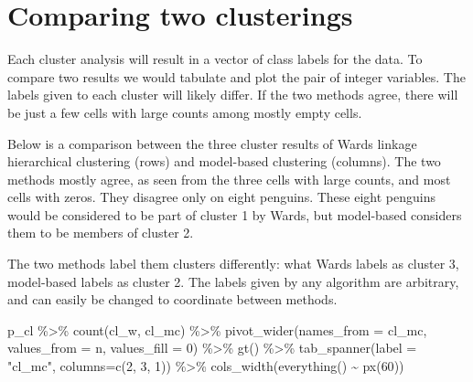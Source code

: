 \documentclass[
  letterpaper,
]{book}
\newenvironment{Shaded}{\begin{snugshade}}{\end{snugshade}}
\newcommand{\AttributeTok}[1]{\textcolor[rgb]{0.40,0.45,0.13}{#1}}
\newcommand{\DecValTok}[1]{\textcolor[rgb]{0.68,0.00,0.00}{#1}}
\newcommand{\FunctionTok}[1]{\textcolor[rgb]{0.28,0.35,0.67}{#1}}
\newcommand{\NormalTok}[1]{\textcolor[rgb]{0.00,0.23,0.31}{#1}}
\newcommand{\SpecialCharTok}[1]{\textcolor[rgb]{0.37,0.37,0.37}{#1}}
\newcommand{\StringTok}[1]{\textcolor[rgb]{0.13,0.47,0.30}{#1}}
\begin{document}
\hypertarget{comparing-two-clusterings}{%
\section{Comparing two clusterings}\label{comparing-two-clusterings}}

Each cluster analysis will result in a vector of class labels for the
data. To compare two results we would tabulate and plot the pair of
integer variables. The labels given to each cluster will likely differ.
If the two methods agree, there will be just a few cells with large
counts among mostly empty cells.

Below is a comparison between the three cluster results of Wards linkage
hierarchical clustering (rows) and model-based clustering (columns). The
two methods mostly agree, as seen from the three cells with large
counts, and most cells with zeros. They disagree only on eight penguins.
These eight penguins would be considered to be part of cluster 1 by
Wards, but model-based considers them to be members of cluster 2.

The two methods label them clusters differently: what Wards labels as
cluster 3, model-based labels as cluster 2. The labels given by any
algorithm are arbitrary, and can easily be changed to coordinate between
methods.

\begin{Shaded}
\begin{Highlighting}[]
\NormalTok{p\_cl }\SpecialCharTok{\%\textgreater{}\%} 
  \FunctionTok{count}\NormalTok{(cl\_w, cl\_mc) }\SpecialCharTok{\%\textgreater{}\%} 
  \FunctionTok{pivot\_wider}\NormalTok{(}\AttributeTok{names\_from =}\NormalTok{ cl\_mc, }
              \AttributeTok{values\_from =}\NormalTok{ n, }
              \AttributeTok{values\_fill =} \DecValTok{0}\NormalTok{) }\SpecialCharTok{\%\textgreater{}\%}
  \FunctionTok{gt}\NormalTok{() }\SpecialCharTok{\%\textgreater{}\%}
  \FunctionTok{tab\_spanner}\NormalTok{(}\AttributeTok{label =} \StringTok{"cl\_mc"}\NormalTok{, }\AttributeTok{columns=}\FunctionTok{c}\NormalTok{(}\StringTok{\textasciigrave{}}\AttributeTok{2}\StringTok{\textasciigrave{}}\NormalTok{, }\StringTok{\textasciigrave{}}\AttributeTok{3}\StringTok{\textasciigrave{}}\NormalTok{, }\StringTok{\textasciigrave{}}\AttributeTok{1}\StringTok{\textasciigrave{}}\NormalTok{)) }\SpecialCharTok{\%\textgreater{}\%}
  \FunctionTok{cols\_width}\NormalTok{(}\FunctionTok{everything}\NormalTok{() }\SpecialCharTok{\textasciitilde{}} \FunctionTok{px}\NormalTok{(}\DecValTok{60}\NormalTok{))}
\end{Highlighting}
\end{Shaded}
\end{document}
